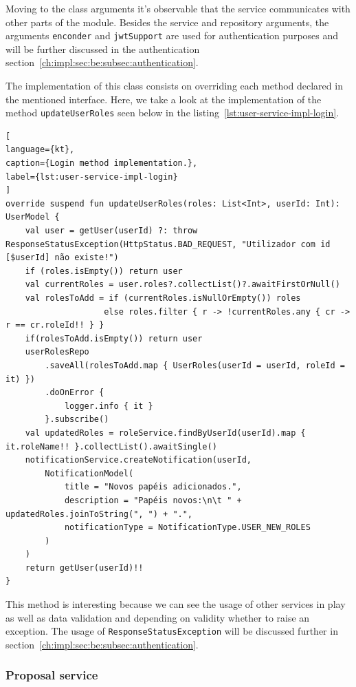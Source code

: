 Moving to the class arguments it's observable that the service communicates with other parts of the module. Besides the service and repository arguments, the arguments \lstinline{enconder} and \lstinline{jwtSupport} are used for authentication purposes and will be further discussed in the authentication section~\ref{ch:impl:sec:be:subsec:authentication}.


The implementation of this class consists on overriding each method declared in the mentioned interface. 
Here, we take a look at the implementation of the method \lstinline{updateUserRoles} seen below in the listing~\ref{lst:user-service-impl-login}.

\begin{lstlisting}[
language={kt},
caption={Login method implementation.},
label={lst:user-service-impl-login}
]
override suspend fun updateUserRoles(roles: List<Int>, userId: Int): UserModel {
    val user = getUser(userId) ?: throw ResponseStatusException(HttpStatus.BAD_REQUEST, "Utilizador com id [$userId] não existe!")
    if (roles.isEmpty()) return user
    val currentRoles = user.roles?.collectList()?.awaitFirstOrNull()
    val rolesToAdd = if (currentRoles.isNullOrEmpty()) roles
                    else roles.filter { r -> !currentRoles.any { cr -> r == cr.roleId!! } }
    if(rolesToAdd.isEmpty()) return user
    userRolesRepo
        .saveAll(rolesToAdd.map { UserRoles(userId = userId, roleId = it) })
        .doOnError {
            logger.info { it }
        }.subscribe()
    val updatedRoles = roleService.findByUserId(userId).map { it.roleName!! }.collectList().awaitSingle()
    notificationService.createNotification(userId,
        NotificationModel(
            title = "Novos papéis adicionados.",
            description = "Papéis novos:\n\t " + updatedRoles.joinToString(", ") + ".",
            notificationType = NotificationType.USER_NEW_ROLES
        )
    )
    return getUser(userId)!!
}
\end{lstlisting}

This method is interesting because we can see the usage of other services in play as well as data validation and depending on validity whether to raise an exception. The usage of \lstinline{ResponseStatusException} will be discussed further in section~\ref{ch:impl:sec:be:subsec:authentication}.

\subsubsection{Proposal service}

